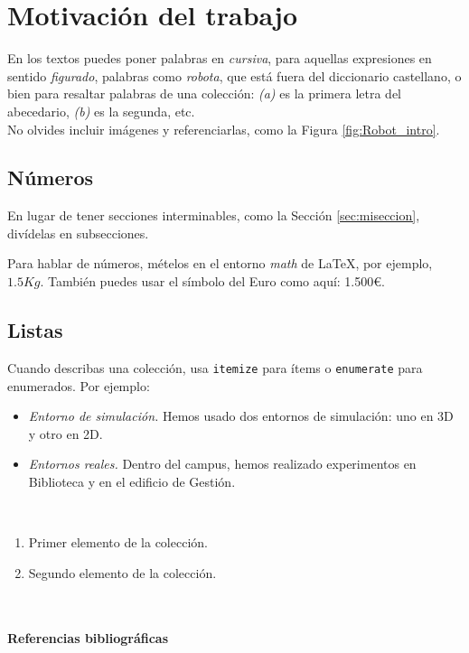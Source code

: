 \section{Motivación del trabajo}
\label{sec:quintaseccion}

En los textos puedes poner palabras en \textit{cursiva}, para aquellas expresiones en sentido \textit{figurado}, palabras como \textit{robota}, que está fuera del diccionario castellano, o bien para resaltar palabras de una colección: \textit{(a)} es la primera letra del abecedario, \textit{(b)} es la segunda, etc.\\



No olvides incluir imágenes y referenciarlas, como la Figura \ref{fig:Robot_intro}.

\subsection{Números}
\label{sec:subseccion}

En lugar de tener secciones interminables, como la Sección \ref{sec:miseccion}, divídelas en subsecciones.

Para hablar de números, mételos en el entorno \textit{math} de \LaTeX, por ejemplo, $1.5Kg$. También puedes usar el símbolo del Euro como aquí: 1.500\euro.

\subsection{Listas}

Cuando describas una colección, usa \texttt{itemize} para ítems o \texttt{enumerate} para enumerados. Por ejemplo:

\begin{itemize}
 \item \textit{Entorno de simulación.} Hemos usado dos entornos de simulación: uno en 3D y otro en 2D.
 \item \textit{Entornos reales.} Dentro del campus, hemos realizado experimentos en Biblioteca y en el edificio de Gestión.
\end{itemize}\

\begin{enumerate}
 \item Primer elemento de la colección.
 \item Segundo elemento de la colección.
\end{enumerate}\

\paragraph{Referencias bibliográficas}
\label{sec:referencias}

